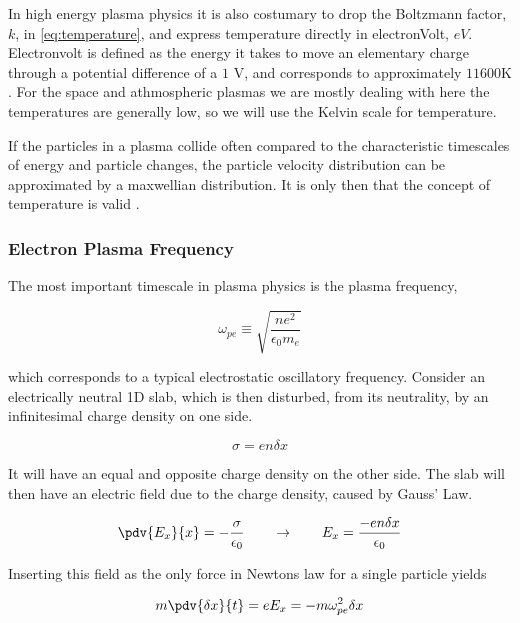 		In high energy plasma physics it is also costumary to drop the Boltzmann factor, \(k\),
		in \cref{eq:temperature}, and express temperature directly in electronVolt, \(eV\).
		Electronvolt is defined as the energy it takes to move an elementary charge through
		a potential difference of a \(1\) \si{\volt}, and corresponds to approximately
		\(11600 \si{\kelvin}\). For the space and athmospheric plasmas we are mostly
		dealing with here the temperatures are generally low, so we will use the Kelvin scale
		for temperature.

		If the particles in a plasma collide often compared to the characteristic timescales
		of energy and particle changes, the particle velocity distribution can be approximated
		by a maxwellian distribution. It is only then that the concept of
		temperature is valid \citep{goldston_introduction_1995}.

		\subsubsection{Electron Plasma Frequency}
		The most important timescale in plasma physics is the plasma frequency,

		\begin{equation}
			\omega_{pe} \equiv \sqrt{\frac{ne^2}{\epsilon_0 m_e}}
		\end{equation}

		which corresponds to a typical electrostatic oscillatory frequency.
		Consider an electrically neutral 1D slab, which is then disturbed, from its
		neutrality, by an infinitesimal charge density on one side.

		\begin{equation}
			\sigma = en\delta x
		\end{equation}

		It will have an equal and opposite charge density on the other side. The slab
		will then have an electric field due to the charge density, caused by Gauss' Law.

		\begin{equation}
			\pdv{E_x}{x} = -\frac{\sigma}{\epsilon_0} \qquad\rightarrow\qquad
			E_x = \frac{-en\delta x}{\epsilon_0}
		\end{equation}

		Inserting this field as the only force in Newtons law for a single particle yields

		\begin{equation}
			m\pdv{\delta x}{t} = eE_x = -m\omega_{pe}^2\delta x
		\end{equation}

